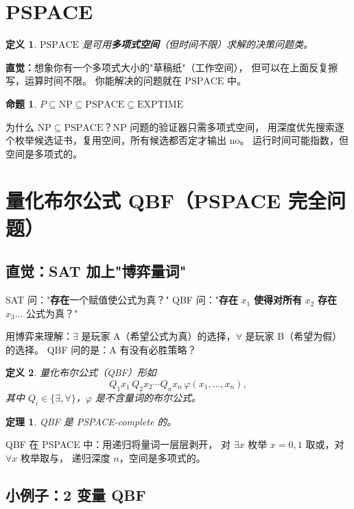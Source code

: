 \documentclass[UTF8,openany,12pt]{ctexbook}
\newtheorem{definition}{定义}[chapter]
\newtheorem{theorem}{定理}[chapter]
\newtheorem{proposition}{命题}[chapter]
\theoremstyle{remark}
\newcommand{\NP}{\mathrm{NP}}
\newcommand{\PSPACE}{\mathrm{PSPACE}}
\newcommand{\EXPTIME}{\mathrm{EXPTIME}}
\begin{document}
\section{PSPACE}

\begin{definition}
$\PSPACE$ 是可用\textbf{多项式空间}（但时间不限）求解的决策问题类。
\end{definition}

\textbf{直觉：}想象你有一个多项式大小的"草稿纸"（工作空间），
但可以在上面反复擦写，运算时间不限。
你能解决的问题就在 $\PSPACE$ 中。

\begin{proposition}
$P \subseteq \NP \subseteq \PSPACE \subseteq \EXPTIME$
\end{proposition}

为什么 $\NP \subseteq \PSPACE$？$\NP$ 问题的验证器只需多项式空间，
用深度优先搜索逐个枚举候选证书，复用空间，所有候选都否定才输出 no。
运行时间可能指数，但空间是多项式的。

\section{量化布尔公式 QBF（PSPACE 完全问题）}

\subsection{直觉：SAT 加上"博弈量词"}

SAT 问："\textbf{存在}一个赋值使公式为真？"
QBF 问："\textbf{存在} $x_1$ \textbf{使得对所有} $x_2$ \textbf{存在} $x_3 \ldots$ 公式为真？"

用博弈来理解：$\exists$ 是玩家 A（希望公式为真）的选择，$\forall$ 是玩家 B（希望为假）的选择。
QBF 问的是：A 有没有必胜策略？

\begin{definition}
量化布尔公式（QBF）形如
\[
  Q_1 x_1\, Q_2 x_2 \cdots Q_n x_n\, \varphi(x_1, \ldots, x_n),
\]
其中 $Q_i \in \{\exists, \forall\}$，$\varphi$ 是不含量词的布尔公式。
\end{definition}

\begin{theorem}
QBF 是 PSPACE-complete 的。
\end{theorem}

QBF 在 PSPACE 中：用递归将量词一层层剥开，
对 $\exists x$ 枚举 $x=0,1$ 取或，对 $\forall x$ 枚举取与，
递归深度 $n$，空间是多项式的。

\subsection{小例子：2 变量 QBF}
\end{document}
